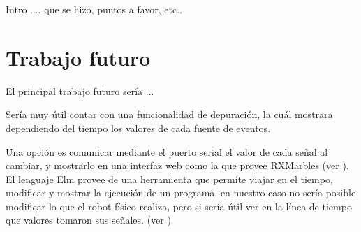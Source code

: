 
Intro .... que se hizo, puntos a favor, etc..

\section{Trabajo futuro}

El principal trabajo futuro sería ...

Sería muy útil contar con una funcionalidad de depuración, la cuál
mostrara dependiendo del tiempo los valores de cada fuente de eventos.

Una opción es comunicar mediante el puerto serial el valor de cada
señal al cambiar, y mostrarlo en una interfaz web como la que provee
RXMarbles (ver \cite{rxmarbles}). 
El lenguaje Elm provee de una herramienta que permite viajar en el 
tiempo, modificar y mostrar la ejecución de un programa, en nuestro
caso no sería posible modificar lo que el robot físico realiza, pero
si sería útil ver en la línea de tiempo que valores tomaron sus
señales. (ver \cite{elmdebug})
